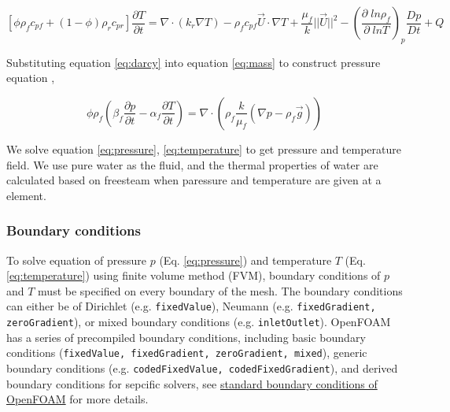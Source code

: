 \begin{equation}
	\left[ {\phi {\rho _f}{c_{pf}} + \left( {1 - \phi } \right){\rho _r}{c_{pr}}} \right]\frac{{\partial T}}{{\partial t}} = \nabla  \cdot \left( {{k_r}\nabla T} \right) - {\rho _f}{c_{pf}} \vec{U} \cdot \nabla T + \frac{{{\mu _f}}}{k}{||\vec{U}||^2} - {\left( {\frac{{\partial \;ln\rho_f }}{{\partial \;lnT}}} \right)_p}\frac{{Dp}}{{Dt}} +Q
	\label{eq:temperature}
\end{equation}


Substituting equation \ref{eq:darcy} into equation \ref{eq:mass} to construct pressure equation \cite[e.g.][Eq. 5]{hasenclever2014hybrid},

\begin{equation}
	\phi \rho_f \left(  \beta_f \frac{\partial p}{\partial t} - \alpha_f \frac{\partial T}{\partial t} \right) = \nabla \cdot \left( \rho_f \frac{k}{\mu_f} \left( \nabla p - \rho_f \vec{g} \right) \right)
	\label{eq:pressure}
\end{equation}

We solve equation \ref{eq:pressure}, \ref{eq:temperature} to get pressure and temperature field. 
We use pure water as the fluid, and the thermal properties of water are calculated based on freesteam when paressure and temperature are given at a element.

\subsubsection{Boundary conditions}

To solve equation of pressure $p$ (Eq. \ref{eq:pressure}) and temperature $T$ (Eq. \ref{eq:temperature}) using finite volume method (FVM),
boundary conditions of $p$ and $T$ must be specified on every boundary of the mesh.
The boundary conditions can either be of Dirichlet (e.g. \texttt{fixedValue}), Neumann (e.g. \texttt{fixedGradient, zeroGradient}), or mixed boundary conditions (e.g. \texttt{inletOutlet}).
OpenFOAM has a series of precompiled boundary conditions, including basic boundary conditions (\texttt{fixedValue, fixedGradient, zeroGradient, mixed}), 
generic boundary conditions (e.g. \texttt{codedFixedValue, codedFixedGradient}),
and derived boundary conditions for sepcific solvers, see \href{https://www.openfoam.com/documentation/user-guide/standard-boundaryconditions.php}{standard boundary conditions of OpenFOAM} for more details. 

